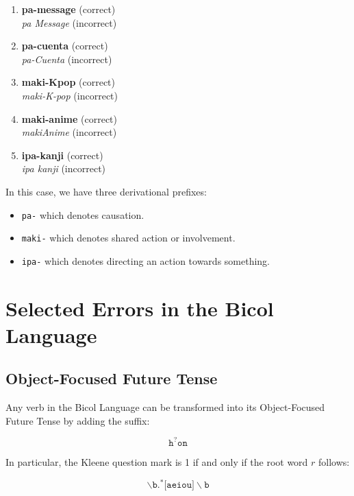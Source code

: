 \begin{example}
\end{example}
\begin{enumerate}
      \item \textbf{pa-message} (correct) \\
            \textit{pa Message} (incorrect)
      \item \textbf{pa-cuenta} (correct) \\
            \textit{pa-Cuenta} (incorrect)
      \item \textbf{maki-Kpop} (correct) \\
            \textit{maki-K-pop} (incorrect)
      \item \textbf{maki-anime} (correct) \\
            \textit{makiAnime} (incorrect)
      \item \textbf{ipa-kanji} (correct) \\
            \textit{ipa kanji} (incorrect)
\end{enumerate}

In this case, we have three derivational prefixes:
\begin{itemize}
    \item \texttt{pa-} which denotes causation.
    \item \texttt{maki-} which denotes shared action or involvement.
    \item \texttt{ipa-} which denotes directing an action towards something.
\end{itemize}

\section{Selected Errors in the Bicol Language}
\subsection{Object-Focused Future Tense}
Any verb in the Bicol Language can be transformed into its Object-Focused Future Tense by adding the suffix:

\[
      \texttt{h}^?\texttt{on}
\]

In particular, the Kleene question mark is 1 if and only if the root word $r$ follows:

\[
      \backslash\texttt{b.}^*\texttt{[aeiou]}\backslash\texttt{b}
\]

\begin{example}
\end{example}

